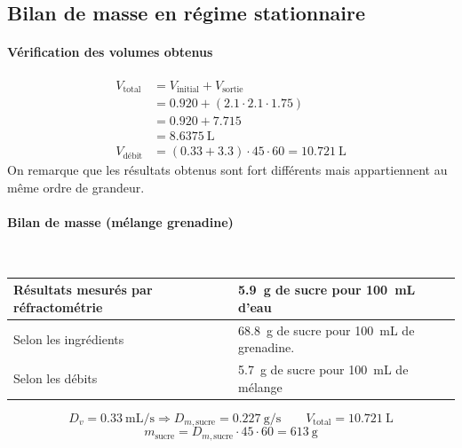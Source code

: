 \documentclass[a4paper,11pt, french]{article}
\begin{document}
\subsection{Bilan de masse en régime stationnaire}
	\paragraph*{Vérification des volumes obtenus}
		\begin{align*} 
			V_\text{total} &= V_\text{initial} + V_\text{sortie} \\
						   &= 0.920 + ( 2.1 \cdot 2.1 \cdot 1.75 ) \\
						   &= 0.920 + 7.715 \\
						   &= \SI{8.6375}{\liter} \\
			V_\text{débit} &= (0.33 + 3.3) \cdot 45 \cdot 60 = \SI{10.721}{\liter}
		\end{align*}
		On remarque que les résultats obtenus sont fort différents mais appartiennent au même ordre de grandeur.
	\paragraph*{Bilan de masse (mélange grenadine)}\mbox{} \\
		\begin{table}[h]
			\centering
			\begin{tabular}{|l|l|}\hline
				Résultats mesurés par réfractométrie & \SI{5.9}{\gram} de sucre pour \SI{100}{\milli\liter} d'eau\\\hline
				Selon les ingrédients & \SI{68.8}{\gram} de sucre pour \SI{100}{\milli\liter} de grenadine.\\\hline
				Selon les débits & \SI{5.7}{\gram} de sucre pour \SI{100}{\milli\liter} de mélange\\\hline
			\end{tabular}
		\end{table}
		$$D_v = \SI{0.33}{\milli\liter\per\second} \Rightarrow D_{m,\text{sucre}} = \SI{0.227}{\gram\per\second} \qquad V_\text{total} = \SI{10.721}{\liter}$$
		$$m_\text{sucre} = D_{m,\text{sucre}} \cdot 45 \cdot 60 = \SI{613}{\gram}$$
\end{document}
